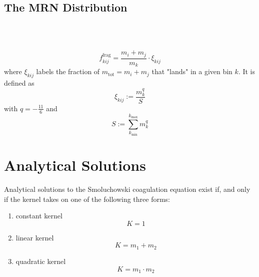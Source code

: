     \subsection{The MRN Distribution}
        
         \\
         \\

        \begin{equation}
            f^\text{frag}_{kij} = \frac{m_i + m_j}{m_k} \cdot \xi_{kij}
        \end{equation}
        where $\xi_{kij}$ labels the fraction of $m_\text{tot} = m_i + m_j$ that "lands" in 
        a given bin $k$. It is defined as 
        \begin{equation}
            \xi_{kij} := \frac{m_k^q}{S}
        \end{equation}
        with $q=-\frac{11}{6}$ and
        \begin{equation}
            S := \sum_{k_\text{min}}^{k_\text{max}} m_k^q %
        \end{equation}



    \clearpage

    \clearpage


\newpage\section{Analytical Solutions}

    Analytical solutions to the Smoluchowski coagulation equation exist if, and only if the kernel
    takes on one of the following three forms:
    \begin{enumerate}
        \item constant kernel
            $$K=1$$
        \item linear kernel
            $$K=m_1+m_2$$
        \item quadratic kernel
            $$K=m_1\cdot m_2$$
    \end{enumerate}
     \\

